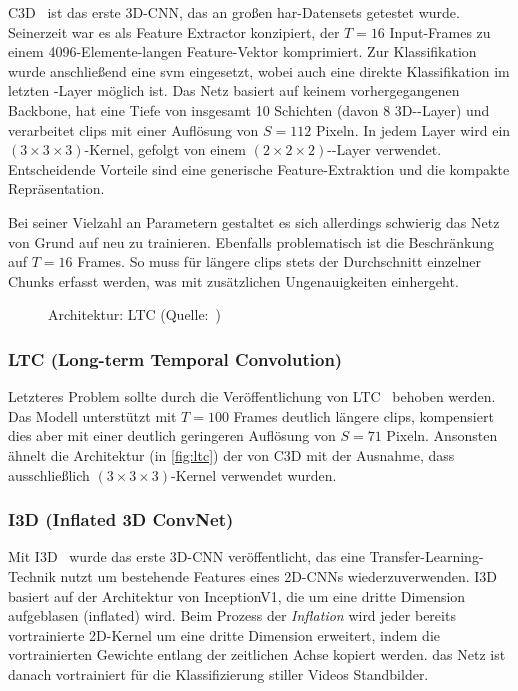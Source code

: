 C3D~\cite{Tran15} ist das erste 3D-CNN, das an großen \gls{har}-Datensets getestet wurde.
Seinerzeit war es als Feature Extractor konzipiert, der $T=16$ Input-Frames zu einem 4096-Elemente-langen Feature-Vektor komprimiert.
Zur Klassifikation wurde anschließend eine \gls{svm} eingesetzt, wobei auch eine direkte Klassifikation im letzten \fc-Layer möglich ist.
Das Netz basiert auf keinem vorhergegangenen Backbone, hat eine Tiefe von insgesamt 10 Schichten (davon 8 3D-\conv-Layer) und verarbeitet \glspl{clip} mit einer Auflösung von $S=112$ Pixeln.
In jedem Layer wird ein $(3 \times 3 \times 3)$-Kernel, gefolgt von einem $(2 \times 2 \times 2)$-\pool-Layer verwendet.
Entscheidende Vorteile sind eine generische Feature-Extraktion und die kompakte Repräsentation.

Bei seiner Vielzahl an Parametern gestaltet es sich allerdings schwierig das Netz von Grund auf neu zu trainieren.
Ebenfalls problematisch ist die Beschränkung auf $T=16$ Frames.
So muss für längere \glspl{clip} stets der Durchschnitt einzelner Chunks erfasst werden, was mit zusätzlichen Ungenauigkeiten einhergeht.

\begin{figure}[h!]
    \centering
    \caption{Architektur: LTC (Quelle:~\cite{Varol18})}
    \label{fig:ltc}
\end{figure}

\subsubsection*{LTC (Long-term Temporal Convolution)}

Letzteres Problem sollte durch die Veröffentlichung von LTC~\cite{Varol18} behoben werden.
Das Modell unterstützt mit $T=100$ Frames deutlich längere \glspl{clip}, kompensiert dies aber mit einer deutlich geringeren Auflösung von $S=71$ Pixeln.
Ansonsten ähnelt die Architektur (in \autoref{fig:ltc}) der von C3D mit der Ausnahme, dass ausschließlich $(3 \times 3 \times 3)$-Kernel verwendet wurden.

\subsubsection*{I3D (Inflated 3D ConvNet)}

Mit I3D~\cite{Carreira17} wurde das erste 3D-CNN veröffentlicht, das eine Transfer-Learning-Technik nutzt um bestehende Features eines 2D-CNNs wiederzuverwenden.
I3D basiert auf der Architektur von InceptionV1, die um eine dritte Dimension aufgeblasen (inflated) wird.
Beim Prozess der \emph{Inflation} wird jeder bereits vortrainierte 2D-Kernel um eine dritte Dimension erweitert, indem die vortrainierten Gewichte entlang der zeitlichen Achse kopiert werden.
\Dh das Netz ist danach vortrainiert für die Klassifizierung stiller Videos \bzw Standbilder.

